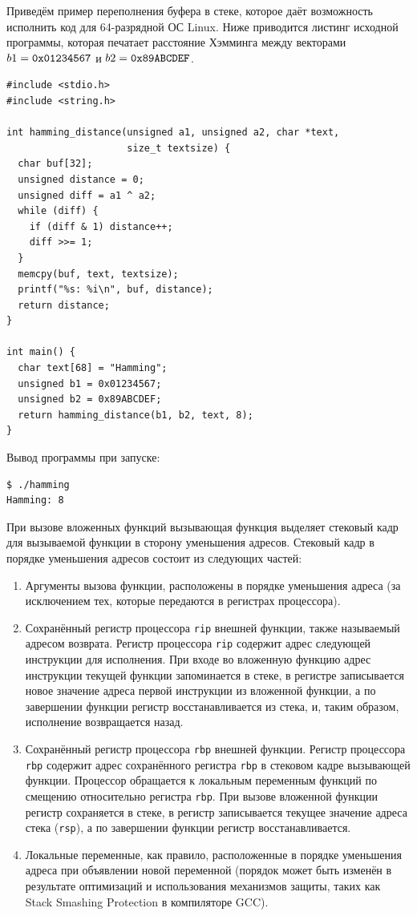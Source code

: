 Приведём пример переполнения буфера в стеке, которое даёт возможность исполнить код для 64-разрядной ОС Linux. Ниже приводится листинг исходной программы, которая печатает расстояние Хэмминга между векторами $b1 = \text{\texttt{0x01234567}}$ и $b2 = \text{\texttt{0x89ABCDEF}}$.

\begin{verbatim}
#include <stdio.h>
#include <string.h>

int hamming_distance(unsigned a1, unsigned a2, char *text,
                     size_t textsize) {
  char buf[32];
  unsigned distance = 0;
  unsigned diff = a1 ^ a2;
  while (diff) {
    if (diff & 1) distance++;
    diff >>= 1;
  }
  memcpy(buf, text, textsize);
  printf("%s: %i\n", buf, distance);
  return distance;
}

int main() {
  char text[68] = "Hamming";
  unsigned b1 = 0x01234567;
  unsigned b2 = 0x89ABCDEF;
  return hamming_distance(b1, b2, text, 8);
}
\end{verbatim}

Вывод программы при запуске:
\begin{verbatim}
$ ./hamming
Hamming: 8
\end{verbatim}

При вызове вложенных функций вызывающая функция выделяет стековый кадр для вызываемой функции в сторону уменьшения адресов. Стековый кадр в порядке уменьшения адресов состоит из следующих частей:
\begin{enumerate}
    \item Аргументы вызова функции, расположены в порядке уменьшения адреса (за исключением тех, которые передаются в регистрах процессора).
    \item Сохранённый регистр процессора \texttt{rip} внешней функции, также называемый адресом возврата. Регистр процессора \texttt{rip} содержит адрес следующей инструкции для исполнения. При входе во вложенную функцию адрес инструкции текущей функции запоминается в стеке, в регистре записывается новое значение адреса первой инструкции из вложенной функции, а по завершении функции регистр восстанавливается из стека, и, таким образом, исполнение возвращается назад.
    \item Сохранённый регистр процессора \texttt{rbp} внешней функции. Регистр процессора \texttt{rbp} содержит адрес сохранённого регистра \texttt{rbp} в стековом кадре вызывающей функции. Процессор обращается к локальным переменным функций по смещению относительно регистра \texttt{rbp}. При вызове вложенной функции регистр сохраняется в стеке, в регистр записывается текущее значение адреса стека (\texttt{rsp}), а по завершении функции регистр восстанавливается.
    \item Локальные переменные, как правило, расположенные в порядке уменьшения адреса при объявлении новой переменной (порядок может быть изменён в результате оптимизаций и использования механизмов защиты, таких как Stack Smashing Protection в компиляторе GCC).
\end{enumerate}


